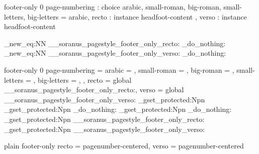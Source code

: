  { footer-only } { 0 }
  {
    page-numbering : choice
      { arabic, small-roman, big-roman, small-letters, big-letters }
                                         = arabic,
    recto          : instance { headfoot-content },
    verso          : instance { headfoot-content }
  }

\cs_new_eq:NN \__soranus_pagestyle_footer_only_recto: \prg_do_nothing:
\cs_new_eq:NN \__soranus_pagestyle_footer_only_verso: \prg_do_nothing:

 { footer-only } { 0 }
  {
    page-numbering =
      {
        arabic        = ,
        small-roman   = ,
        big-roman     = ,
        small-letters = ,
        big-letters   = ,
      },
      recto        = global \__soranus_pagestyle_footer_only_recto:,
      verso        = global \__soranus_pagestyle_footer_only_verso:
  }
  {
    \AssignTemplateKeys
    \cs_gset_protected:Npn \@mkboth { \markboth }
    \cs_gset_protected:Npn \@oddhead
      { \prg_do_nothing: }
    \cs_gset_protected:Npn \@evenhead
      { \prg_do_nothing: }
    \cs_gset_protected:Npn \@oddfoot
      { \__soranus_pagestyle_footer_only_recto: }
    \cs_gset_protected:Npn \@evenfoot
      { \__soranus_pagestyle_footer_only_verso: }
  }


%

 { plain } { footer-only }
  {
    recto = pagenumber-centered,
    verso = pagenumber-centered
  }



%
